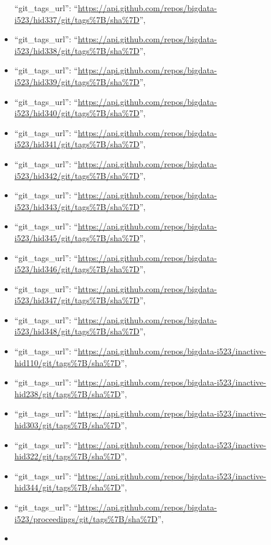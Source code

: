 \begin{itemize}
  ``git\_tags\_url'':
  ``\url{https://api.github.com/repos/bigdata-i523/hid337/git/tags\%7B/sha\%7D}'',
\item
  ``git\_tags\_url'':
  ``\url{https://api.github.com/repos/bigdata-i523/hid338/git/tags\%7B/sha\%7D}'',
\item
  ``git\_tags\_url'':
  ``\url{https://api.github.com/repos/bigdata-i523/hid339/git/tags\%7B/sha\%7D}'',
\item
  ``git\_tags\_url'':
  ``\url{https://api.github.com/repos/bigdata-i523/hid340/git/tags\%7B/sha\%7D}'',
\item
  ``git\_tags\_url'':
  ``\url{https://api.github.com/repos/bigdata-i523/hid341/git/tags\%7B/sha\%7D}'',
\item
  ``git\_tags\_url'':
  ``\url{https://api.github.com/repos/bigdata-i523/hid342/git/tags\%7B/sha\%7D}'',
\item
  ``git\_tags\_url'':
  ``\url{https://api.github.com/repos/bigdata-i523/hid343/git/tags\%7B/sha\%7D}'',
\item
  ``git\_tags\_url'':
  ``\url{https://api.github.com/repos/bigdata-i523/hid345/git/tags\%7B/sha\%7D}'',
\item
  ``git\_tags\_url'':
  ``\url{https://api.github.com/repos/bigdata-i523/hid346/git/tags\%7B/sha\%7D}'',
\item
  ``git\_tags\_url'':
  ``\url{https://api.github.com/repos/bigdata-i523/hid347/git/tags\%7B/sha\%7D}'',
\item
  ``git\_tags\_url'':
  ``\url{https://api.github.com/repos/bigdata-i523/hid348/git/tags\%7B/sha\%7D}'',
\item
  ``git\_tags\_url'':
  ``\url{https://api.github.com/repos/bigdata-i523/inactive-hid110/git/tags\%7B/sha\%7D}'',
\item
  ``git\_tags\_url'':
  ``\url{https://api.github.com/repos/bigdata-i523/inactive-hid238/git/tags\%7B/sha\%7D}'',
\item
  ``git\_tags\_url'':
  ``\url{https://api.github.com/repos/bigdata-i523/inactive-hid303/git/tags\%7B/sha\%7D}'',
\item
  ``git\_tags\_url'':
  ``\url{https://api.github.com/repos/bigdata-i523/inactive-hid322/git/tags\%7B/sha\%7D}'',
\item
  ``git\_tags\_url'':
  ``\url{https://api.github.com/repos/bigdata-i523/inactive-hid344/git/tags\%7B/sha\%7D}'',
\item
  ``git\_tags\_url'':
  ``\url{https://api.github.com/repos/bigdata-i523/proceedings/git/tags\%7B/sha\%7D}'',
\item

\end{itemize}
